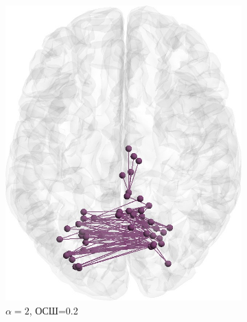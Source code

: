 \begin{figure}[htbp]
\begin{subfigure}[t]{0.24\textwidth}
        \includegraphics[width=0.99\linewidth]{../images/loreta_brain_jitter_2_snr_02_phase_lag_07854.jpg}
        \caption{$\alpha=2$, ОСШ=0.2}\label{fig:unbiased_1_ntw_b}
    \end{subfigure}
    \begin{subfigure}[t]{0.24\textwidth}

\end{subfigure}
\end{figure}
